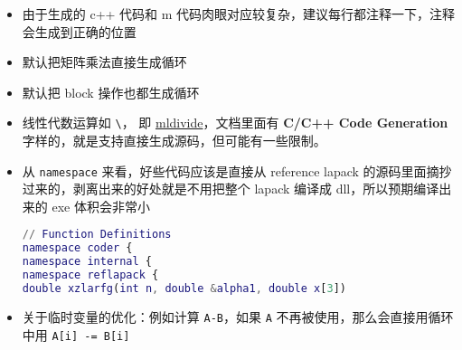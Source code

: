\begin{itemize}
\begin{lstlisting}[language=matlab]
% 加减乘除、取矩阵元
% a = rand(3, 4);
a = rand(3, 4);
% ret=ret+ sprintf('sum(a) = %0.5e\n', sum(a(:)));
ret=ret+ sprintf('sum(a) = %0.5e\n', sum(a(:)));
% b = rand(3, 4);
b = rand(3, 4);
% ret=ret+ sprintf('sum(b) = %0.5e\n', sum(b(:)));
ret=ret+ sprintf('sum(b) = %0.5e\n', sum(b(:)));
% c = sqrt(a.^2 + b.^2);
c = sqrt(a.^2 + b.^2);
% ret=ret+ sprintf('sum(c) = %0.5e\n', sum(c(:)));
ret=ret+ sprintf('sum(c) = %0.5e\n', sum(c(:)));
% for i = 1:3
for i = 1:3
    % for j = 1:4
    for j = 1:4
        % if c(i, j) ~= sqrt(a(i,j)^2 + b(i, j)^2)
        if c(i, j) ~= sqrt(a(i,j)^2 + b(i, j)^2)
            ret=ret+ sprintf('error: c(i, j) = %0.5e\n', c(i, j));
        end
    end
end

% 解线性方程组
% A = rand(30,30);
A = rand(30,30);
% ret=ret+ sprintf('sum(A) = %0.5e\n', sum(A(:)));
ret=ret+ sprintf('sum(A) = %0.5e\n', sum(A(:)));
% X = rand(30,100);
X = rand(30,100);
% ret=ret+ sprintf('sum(X) = %0.5e\n', sum(X(:)));
ret=ret+ sprintf('sum(X) = %0.5e\n', sum(X(:)));
% B = A * X;
B = A * X;
% ret=ret+ sprintf('sum(B) = %0.5e\n', sum(B(:)));
ret=ret+ sprintf('sum(B) = %0.5e\n', sum(B(:)));
% X1 = A \ B;
X1 = A \ B;
% ret=ret+ sprintf('sum(X1) = %0.5e\n', sum(X1(:)));
ret=ret+ sprintf('sum(X1) = %0.5e\n', sum(X1(:)));
% if norm(X-X1) > 1e-10
if norm(X-X1) > 1e-10
    % ret=ret+ sprintf('error: norm(X-X1) = %0.5e\n', norm(X-X1));
    ret=ret+ sprintf('error: norm(X-X1) = %0.5e\n', norm(X-X1));
end

% 本征问题
% A = A + A.';
A = A + A.';
% ret=ret+ sprintf('sum(A) = %0.5e\n', sum(A(:)));
ret=ret+ sprintf('sum(A) = %0.5e\n', sum(A(:)));
% [V, D] = eig(A);
[V, D] = eig(A);
% err = max(max(abs(A*V - V*D)));
err = max(max(abs(A*V - V*D)));
% if err > 1e-10
if err > 1e-10
    % ret=ret+ sprintf('error: err = %0.5e\n', err);
    ret=ret+ sprintf('error: err = %0.5e\n', err);
end
end
\end{lstlisting}
\item 由于生成的 c++ 代码和 m 代码肉眼对应较复杂，建议每行都注释一下，注释会生成到正确的位置
\item 默认把矩阵乘法直接生成循环
\item 默认把 block 操作也都生成循环
\item 线性代数运算如 \verb`\`， 即 \href{https://www.mathworks.com/help/releases/R2024b/matlab/ref/double.mldivide.html}{mldivide}，文档里面有 \textbf{C/C++ Code Generation} 字样的，就是支持直接生成源码，但可能有一些限制。
\item 从 \verb`namespace` 来看，好些代码应该是直接从 reference lapack 的源码里面摘抄过来的，剥离出来的好处就是不用把整个 lapack 编译成 dll，所以预期编译出来的 exe 体积会非常小
\begin{lstlisting}[language=matlab]
// Function Definitions
namespace coder {
namespace internal {
namespace reflapack {
double xzlarfg(int n, double &alpha1, double x[3])
\end{lstlisting}
\item 关于临时变量的优化：例如计算 \verb`A-B`，如果 \verb`A` 不再被使用，那么会直接用循环中用 \verb`A[i] -= B[i]`
\end{itemize}
